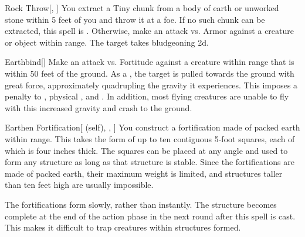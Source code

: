\begin{ability}[\nth{1}]{Rock Throw}[, ]
You extract a Tiny chunk from a body of earth or unworked stone within 5 feet of you and throw it at a foe.
If no such chunk can be extracted, this spell is .
Otherwise, make an attack vs. Armor against a creature or object within \rngmed range.
\hit The target takes bludgeoning  \plus2d.
\end{ability}
\vspace{0.25em}



\begin{ability}[\nth{2}]{Earthbind}[]
Make an attack vs. Fortitude against a creature within \rngmed range that is within 50 feet of the ground.
\hit As a , the target is pulled towards the ground with great force, approximately quadrupling the gravity it experiences.
This imposes a  penalty to , physical , and .
In addition, most flying creatures are unable to fly with this increased gravity and crash to the ground.
\end{ability}
\vspace{0.25em}



\begin{ability}[\nth{2}]{Earthen Fortification}[ (self), , ]
You construct a fortification made of packed earth within \rngmed range.
This takes the form of up to ten contiguous 5-foot squares, each of which is four inches thick.
The squares can be placed at any angle and used to form any structure as long as that structure is stable.
Since the fortifications are made of packed earth, their maximum weight is limited, and structures taller than ten feet high are usually impossible.

The fortifications form slowly, rather than instantly.
The structure becomes complete at the end of the action phase in the next round after this spell is cast.
This makes it difficult to trap creatures within structures formed.
\end{ability}
\vspace{0.25em}




